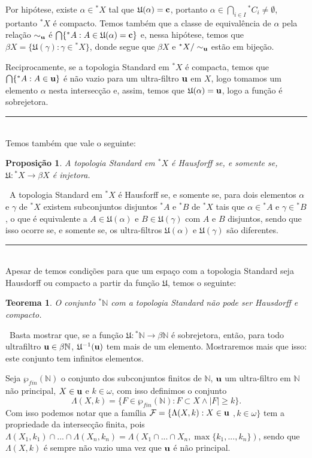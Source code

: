 \documentclass[11pt,a4paper]{article}
\newtheorem{thrm}[mydef]{Teorema}
\newtheorem{prop}[mydef]{Proposição}
\def\dem{\par\smallbreak\noindent {\textit{ Demonstração:}} \ }
\def\eop{\hfill\rule{2.5mm}{2.5mm} \\ }
\theoremstyle{definition}
\begin{document}
Por hipótese, existe $\alpha \in  {^*X}$ tal que $\mathfrak{U}(\alpha)=\bf{c}$, portanto $\alpha\in \bigcap_{i\in I} {^*C_i}\neq \emptyset$, portanto ${^*X}$ é compacto. Temos também que a classe de equivalência de $\alpha$ pela relação $\sim_{\bf{u} }$ é $\bigcap \{{^*A}: A\in \mathfrak{U}(\alpha)=\bf{c} \}$ e, nessa hipótese, temos que $\beta X = \{ \mathfrak{U}(\gamma):\gamma \in {^*X}  \}$, donde segue que $\beta X$ e ${^*X}/ \sim_{\bf{u} }$ estão em bijeção. 

Reciprocamente, se a topologia Standard em ${^*X}$ é compacta, temos que $\bigcap \{{^*A}: A\in \bf{u} \}$ é não vazio para um ultra-filtro $\bf{u} $ em $X$, logo tomamos um elemento $\alpha$ nesta intersecção e, assim, temos que $\mathfrak{U}(\alpha)=\bf{u}$, logo a função é sobrejetora. \eop 

Temos também que vale o seguinte: 

\begin{prop}
	
	A topologia Standard em $^*X$ é Hausforff se, e somente se, $\mathfrak{U}: {^*X}\rightarrow \beta X$ é injetora.
	
\end{prop}

\dem A topologia Standard em $^*X$ é Hausforff se, e somente se, para dois elementos $\alpha$ e $\gamma$ de $^*X$ existem subconjuntos disjuntos $^*A$ e $^*B$ de $^*X$ tais que  $\alpha\in {^*A}$ e $\gamma \in {^*B}$, o que é equivalente a $A\in \mathfrak{U}(\alpha)$ e $B\in \mathfrak{U}(\gamma)$ com $A$ e $B$ disjuntos, sendo que isso ocorre se, e somente se, os ultra-filtros $\mathfrak{U}(\alpha)$ e $\mathfrak{U}(\gamma)$ são diferentes. \eop

Apesar de temos condições para que um espaço com a topologia Standard seja Hausdorff ou compacto a partir da função $\mathfrak{U}$, temos o seguinte: 

\begin{thrm}
	
	O conjunto $^*\mathbb{N}$ com a topologia Standard não pode ser Hausdorff e compacto. 
	
\end{thrm}


\dem Basta mostrar que, se a função $\mathfrak{U}: {^*\mathbb{N}}\rightarrow \beta \mathbb{N}$ é sobrejetora, então, para todo ultrafiltro $\bf{u}\in \beta \mathbb{N}$, $\mathfrak{U}^{-1}(\bf{u})$ tem mais de um elemento. Mostraremos mais que isso: este conjunto tem infinitos elementos. 

Seja $\wp_{fin} (\mathbb{N})$ o conjunto dos subconjuntos finitos de $\mathbb{N}$, $\bf{u}$ um ultra-filtro em $\mathbb{N}$ não principal, $X\in \bf{u}$ e $k\in \omega$, com isso definimos o conjunto $$\Lambda (X,k)=\{ F\in \wp_{fin} (\mathbb{N}) : F\subset X \wedge |F|\geq k  \}.$$ Com isso podemos notar que a família $\mathcal{F}=\{ \Lambda (X,k): X\in \bf{u}$ $,k\in\omega  \}$ tem a propriedade da intersecção finita, pois $\Lambda (X_1,k_1) \cap ... \cap \Lambda (X_n,k_n)=\Lambda (X_1\cap ... \cap X_n,\max \{ k_1,...,k_n \})$, sendo que $\Lambda (X,k)$ é sempre não vazio uma vez que $\bf{u}$ é não principal. 
\end{document}

